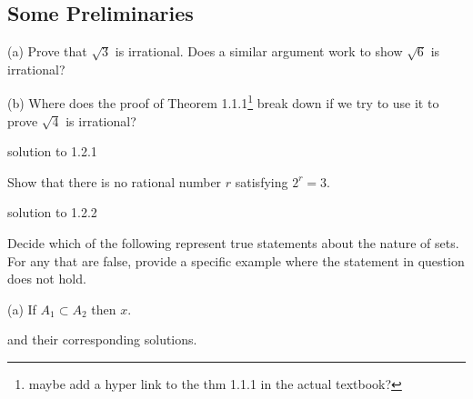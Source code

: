 \documentclass[12pt]{article}
\begin{document}
\subsection{Some Preliminaries}

\begin{exercise}

    (a) Prove that \( \sqrt{3} \) is irrational. Does a similar argument work to show \( \sqrt{6} \) is irrational?

    (b) Where does the proof of Theorem 1.1.1\footnote{maybe add a hyper link to the thm 1.1.1 in the actual textbook?} break down if we try to use it to prove \( \sqrt{4} \) is irrational?
\end{exercise}
\begin{solution}
    solution to 1.2.1
\end{solution}


\begin{exercise}
    Show that there is no rational number \( r \) satisfying \( 2^{r} = 3 \).
\end{exercise}
\begin{solution}
    solution to 1.2.2
\end{solution}


\begin{exercise}
    Decide which of the following represent true statements about the nature of sets. For any that are false, provide a specific example where the statement in question does not hold.

    (a) If \( A_{1} \subset A_{2} \) then \( x \).
\end{exercise}
\begin{solution}
    and their corresponding solutions.
\end{solution}
\end{document}
